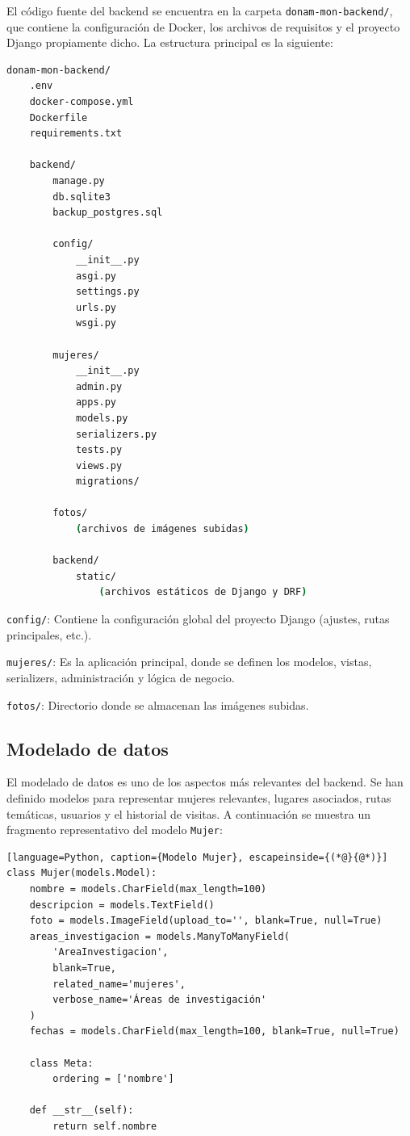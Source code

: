 El código fuente del backend se encuentra en la carpeta \texttt{donam-mon-backend/}, que contiene la configuración de Docker, los archivos de requisitos y el proyecto Django propiamente dicho. La estructura principal es la siguiente:

\begin{lstlisting}[language=bash, caption={Estructura principal del backend}]
donam-mon-backend/
    .env
    docker-compose.yml
    Dockerfile
    requirements.txt

    backend/
        manage.py
        db.sqlite3
        backup_postgres.sql

        config/
            __init__.py
            asgi.py
            settings.py
            urls.py
            wsgi.py

        mujeres/
            __init__.py
            admin.py
            apps.py
            models.py
            serializers.py
            tests.py
            views.py
            migrations/

        fotos/
            (archivos de imágenes subidas)

        backend/
            static/
                (archivos estáticos de Django y DRF)
\end{lstlisting}

\texttt{config/}: Contiene la configuración global del proyecto Django (ajustes, rutas principales, etc.).

\texttt{mujeres/}: Es la aplicación principal, donde se definen los modelos, vistas, serializers, administración y lógica de negocio.

\texttt{fotos/}: Directorio donde se almacenan las imágenes subidas.


\subsection{Modelado de datos}

El modelado de datos es uno de los aspectos más relevantes del backend. Se han definido modelos para representar mujeres relevantes, lugares asociados, rutas temáticas, usuarios y el historial de visitas. A continuación se muestra un fragmento representativo del modelo \texttt{Mujer}:

\begin{lstlisting}[language=Python, caption={Modelo Mujer}, escapeinside={(*@}{@*)}]
class Mujer(models.Model):
    nombre = models.CharField(max_length=100)
    descripcion = models.TextField()
    foto = models.ImageField(upload_to='', blank=True, null=True)
    areas_investigacion = models.ManyToManyField( 
        'AreaInvestigacion', 
        blank=True,
        related_name='mujeres',
        verbose_name='Áreas de investigación'
    )
    fechas = models.CharField(max_length=100, blank=True, null=True)
    
    class Meta: 
        ordering = ['nombre']
    
    def __str__(self):
        return self.nombre
\end{lstlisting}

